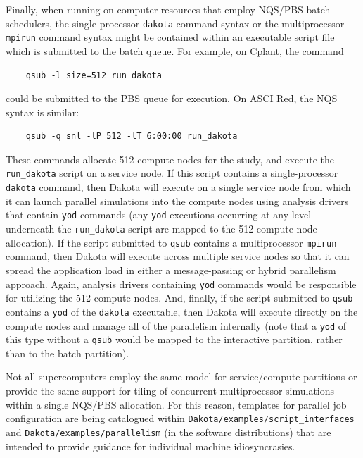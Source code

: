 Finally, when running on computer resources that employ NQS/PBS batch
schedulers, the single-processor \texttt{dakota} command syntax or the
multiprocessor \texttt{mpirun} command syntax might be contained
within an executable script file which is submitted to the batch
queue. For example, on Cplant, the command
\begin{small}
\begin{verbatim}
    qsub -l size=512 run_dakota
\end{verbatim}
\end{small}

could be submitted to the PBS queue for execution. On ASCI Red, the
NQS syntax is similar:
\begin{small}
\begin{verbatim}
    qsub -q snl -lP 512 -lT 6:00:00 run_dakota
\end{verbatim}
\end{small}

These commands allocate 512 compute nodes for the study, and execute
the \texttt{run\_dakota} script on a service node. If this script
contains a single-processor \texttt{dakota} command, then Dakota will
execute on a single service node from which it can launch parallel
simulations into the compute nodes using analysis drivers that contain
\texttt{yod} commands (any \texttt{yod} executions occurring at any
level underneath the \texttt{run\_dakota} script are mapped to the 512
compute node allocation). If the script submitted to \texttt{qsub}
contains a multiprocessor \texttt{mpirun} command, then Dakota will
execute across multiple service nodes so that it can spread the
application load in either a message-passing or hybrid parallelism
approach. Again, analysis drivers containing \texttt{yod} commands
would be responsible for utilizing the 512 compute nodes. And,
finally, if the script submitted to \texttt{qsub} contains a
\texttt{yod} of the \texttt{dakota} executable, then Dakota will
execute directly on the compute nodes and manage all of the
parallelism internally (note that a \texttt{yod} of this type without
a \texttt{qsub} would be mapped to the interactive partition, rather
than to the batch partition).

Not all supercomputers employ the same model for service/compute
partitions or provide the same support for tiling of concurrent
multiprocessor simulations within a single NQS/PBS allocation.  For
this reason, templates for parallel job configuration are being
catalogued within {\tt Dakota/examples/script\_interfaces} and 
\texttt{Dakota/examples/parallelism} (in the software
distributions) that are intended to provide guidance for individual
machine idiosyncrasies.

